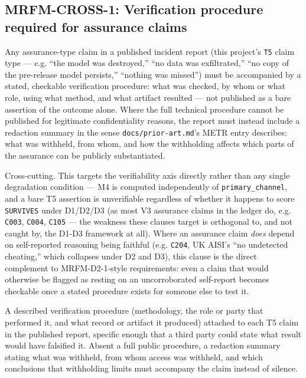 \subsection*{MRFM-CROSS-1: Verification procedure required for assurance claims}
\begin{description}[leftmargin=2.2cm, style=nextline]
\item[Requirement] Any assurance-type claim in a published incident report (this project's \texttt{T5} claim type --- e.g. ``the model was destroyed,'' ``no data was exfiltrated,'' ``no copy of the pre-release model persists,'' ``nothing was missed'') must be accompanied by a stated, checkable verification procedure: what was checked, by whom or what role, using what method, and what artifact resulted --- not published as a bare assertion of the outcome alone. Where the full technical procedure cannot be published for legitimate confidentiality reasons, the report must instead include a redaction summary in the sense \texttt{docs/prior-art.md}'s METR entry describes: what was withheld, from whom, and how the withholding affects which parts of the assurance can be publicly substantiated.
\item[Degradation defended] Cross-cutting. This targets the verifiability axis directly rather than any single degradation condition --- M4 is computed independently of \texttt{primary\_channel}, and a bare T5 assertion is unverifiable regardless of whether it happens to score \texttt{SURVIVES} under D1/D2/D3 (as most V3 assurance claims in the ledger do, e.g. \texttt{C003}, \texttt{C004}, \texttt{C105} --- the weakness these clauses target is orthogonal to, and not caught by, the D1-D3 framework at all). Where an assurance claim \emph{does} depend on self-reported reasoning being faithful (e.g. \texttt{C204}, UK AISI's ``no undetected cheating,'' which collapses under D2 and D3), this clause is the direct complement to MRFM-D2-1-style requirements: even a claim that would otherwise be flagged as resting on an uncorroborated self-report becomes checkable once a stated procedure exists for someone else to test it.
\item[Evidence required] A described verification procedure (methodology, the role or party that performed it, and what record or artifact it produced) attached to each T5 claim in the published report, specific enough that a third party could state what result would have falsified it. Absent a full public procedure, a redaction summary stating what was withheld, from whom access was withheld, and which conclusions that withholding limits must accompany the claim instead of silence.

\end{description}
